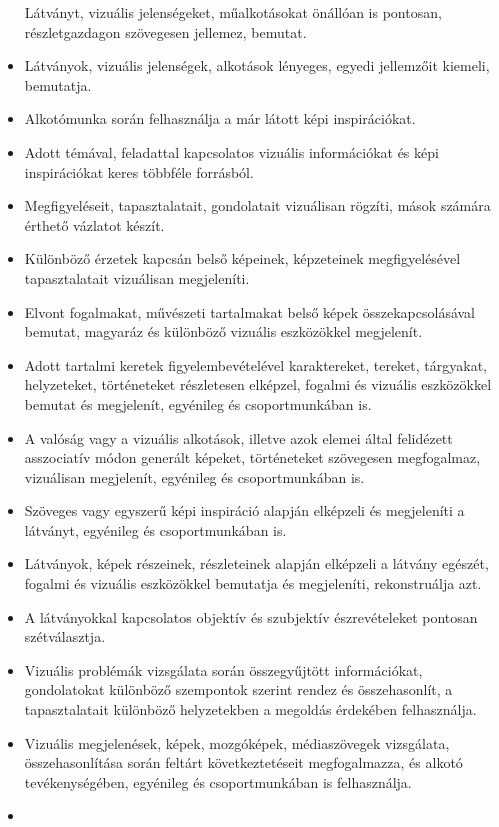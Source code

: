 \begin{itemize}
  Látványt, vizuális jelenségeket, műalkotásokat önállóan is pontosan,
  részletgazdagon szövegesen jellemez, bemutat.
\item
  Látványok, vizuális jelenségek, alkotások lényeges, egyedi jellemzőit
  kiemeli, bemutatja.
\item
  Alkotómunka során felhasználja a már látott képi inspirációkat.
\item
  Adott témával, feladattal kapcsolatos vizuális információkat és képi
  inspirációkat keres többféle forrásból.
\item
  Megfigyeléseit, tapasztalatait, gondolatait vizuálisan rögzíti, mások
  számára érthető vázlatot készít.
\item
  Különböző érzetek kapcsán belső képeinek, képzeteinek megfigyelésével
  tapasztalatait vizuálisan megjeleníti.
\item
  Elvont fogalmakat, művészeti tartalmakat belső képek
  összekapcsolásával bemutat, magyaráz és különböző vizuális eszközökkel
  megjelenít.
\item
  Adott tartalmi keretek figyelembevételével karaktereket, tereket,
  tárgyakat, helyzeteket, történeteket részletesen elképzel, fogalmi és
  vizuális eszközökkel bemutat és megjelenít, egyénileg és
  csoportmunkában is.
\item
  A valóság vagy a vizuális alkotások, illetve azok elemei által
  felidézett asszociatív módon generált képeket, történeteket szövegesen
  megfogalmaz, vizuálisan megjelenít, egyénileg és csoportmunkában is.
\item
  Szöveges vagy egyszerű képi inspiráció alapján elképzeli és
  megjeleníti a látványt, egyénileg és csoportmunkában is.
\item
  Látványok, képek részeinek, részleteinek alapján elképzeli a látvány
  egészét, fogalmi és vizuális eszközökkel bemutatja és megjeleníti,
  rekonstruálja azt.
\item
  A látványokkal kapcsolatos objektív és szubjektív észrevételeket
  pontosan szétválasztja.
\item
  Vizuális problémák vizsgálata során összegyűjtött információkat,
  gondolatokat különböző szempontok szerint rendez és összehasonlít, a
  tapasztalatait különböző helyzetekben a megoldás érdekében
  felhasználja.
\item
  Vizuális megjelenések, képek, mozgóképek, médiaszövegek vizsgálata,
  összehasonlítása során feltárt következtetéseit megfogalmazza, és
  alkotó tevékenységében, egyénileg és csoportmunkában is felhasználja.
\item

\end{itemize}
